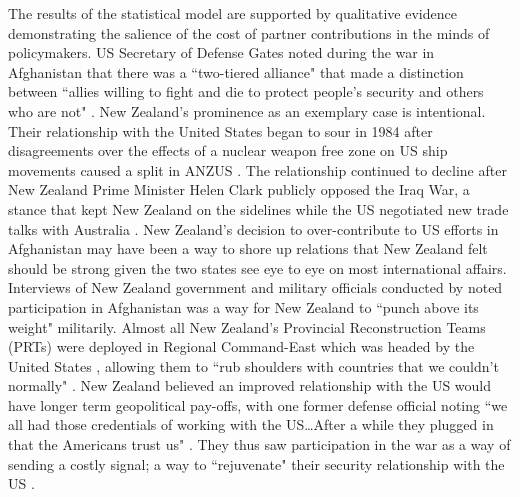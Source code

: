 \documentclass[12pt,letterpaper]{article}
\begin{document}
		The results of the statistical model are supported by qualitative evidence demonstrating the salience of the cost of partner contributions in the minds of policymakers. US Secretary of Defense Gates noted during the war in Afghanistan that there was a ``two-tiered alliance" that made a distinction between ``allies willing to fight and die to protect people's security and others who are not" \citep[328]{ringsmose_natoburdensharingredux_2010}. New Zealand's prominence as an exemplary case is intentional. Their relationship with the United States began to sour in 1984 after disagreements over the effects of a nuclear weapon free zone on US ship movements caused a split in ANZUS \citep{catalinac_whynewzealand_2010}. The relationship continued to decline after New Zealand Prime Minister Helen Clark publicly opposed the Iraq War, a stance that kept New Zealand on the sidelines while the US negotiated new trade talks with Australia \citep{armstrong_alliesrewardedtrade_2003}. New Zealand's decision to over-contribute to US efforts in Afghanistan may have been a way to shore up relations that New Zealand felt should be strong given the two states see eye to eye on most international affairs. Interviews of New Zealand government and military officials conducted by \citet{wellings_narrativealignmentmisalignment_2018} noted participation in Afghanistan was a way for New Zealand to ``punch above its weight" militarily. Almost all New Zealand's Provincial Reconstruction Teams (PRTs) were deployed in Regional Command-East which was headed by the United States \citep[49]{auerswald_natoafghanistanfighting_2014}, allowing them to ``rub shoulders with countries that we couldn't normally" \citep{wellings_narrativealignmentmisalignment_2018}. New Zealand believed an improved relationship with the US would have longer term geopolitical pay-offs, with one former defense official noting ``we all had those credentials of working with the US\ldots After a while they plugged in that the Americans trust us" \citep[31]{wellings_narrativealignmentmisalignment_2018}. They thus saw participation in the war as a way of sending a costly signal; a way to ``rejuvenate" their security relationship with the US \citep[128]{burton_natodurabilitypostcold_2018}.
		
\end{document}
